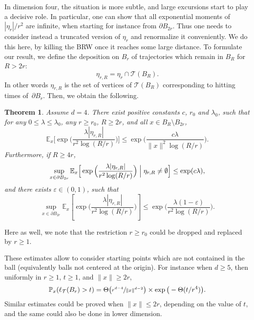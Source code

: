 \documentclass[JEP,XML,SOM,Unicode,NoFloatCountersInSection,published]{cedram}
\theoremstyle{plain}
\newtheorem{theorem}{Theorem}[section]
\theoremstyle{definition}
\newcommand\T{\mathcal{T}}
\newcommand{\1}{{\text{\Large $\mathfrak 1$}}}
\begin{document}
In dimension four, the situation is more subtle, and large excursions start to play a decisive role.
In particular, one can show that
all exponential moments of $|\eta_r|/r^2$ are infinite, when starting for instance from $\partial B_{2r}$.
Thus one needs to consider instead a truncated version of $\eta_r$ and renormalize it conveniently.
We do this here, by killing the BRW once it reaches some
large distance. To formulate our result, we define the deposition on $B_r$ of
trajectories which remain in $B_R$ for $R>2r$:
\begin{equation*}%
\eta_{r,R} = \eta_r\cap \T(B_R).
\end{equation*}
In other words $\eta_{r,R}$ is the set of vertices
of $\mathcal T(B_R)$ corresponding to hitting times of~$\partial B_r$. Then, we obtain the following.
\begin{theorem}\label{theo.outside4}
Assume $d = 4$. There exist positive constants $c$, $r_0$ and $\lambda_0$, such that for any $0\le \lambda\le \lambda_0$, any $r\ge r_0$, $R\ge 2r$,
and all $x\in B_R\setminus B_{2r}$,
\begin{equation}\label{outside4.1}
\mathbb E_x\Big[\exp \Big(\frac{\lambda|\eta_{r,R}|}{r^2\log (R/r)} \Big)\Big] \le \exp\Big(\frac{c\lambda}{\|x\|^2\log (R/r)}\Big).
\end{equation}
Furthermore, if $R\ge 4r$,
\begin{equation}\label{outside4.2}
\sup_{x\in \partial B_{2r}} \mathbb E_x\Big[
\exp \Big(\frac{\lambda|\eta_{r,R}|}{r^2\log (R/r)} \Big)\Bigm| \eta_{r,R}\neq \emptyset \Big] \le \exp(c\lambda),
\end{equation}
and there exists $\varepsilon \in (0,1)$, such that
\begin{equation}\label{outside4.3}
\sup_{x\in \partial B_{2r}} \mathbb E_x\left[\exp\Big(
\frac{\lambda |\eta_{r,R}|}{r^2\log(R/r)}\Big)\right] \le \exp\Big(\frac{\lambda(1-\varepsilon)}{r^2\log(R/r)}\Big).
\end{equation}
\end{theorem}
Here as well, we note that the restriction $r\ge r_0$ could be dropped and replaced by $r\ge 1$.

These estimates allow to consider starting points which
are not contained in the ball (equivalently balls not centered at the origin).
For instance when $d\ge 5$, then uniformly in $r\ge 1$, $t\ge 1$, and $\|x\|\ge 2r$,
\begin{equation*}
\mathbb P_x(\ell_{\T}(B_r) > t) =
\Theta\big(\sfrac{r^{d-4}}{\|x\|^{d-2}}\big) \times\exp \big(-\Theta(t/r^4)\big).
\end{equation*}
Similar estimates could be proved when $\|x\|\le 2r$,
depending on the value of $t$, and the same could also be done in lower dimension.
\end{document}
